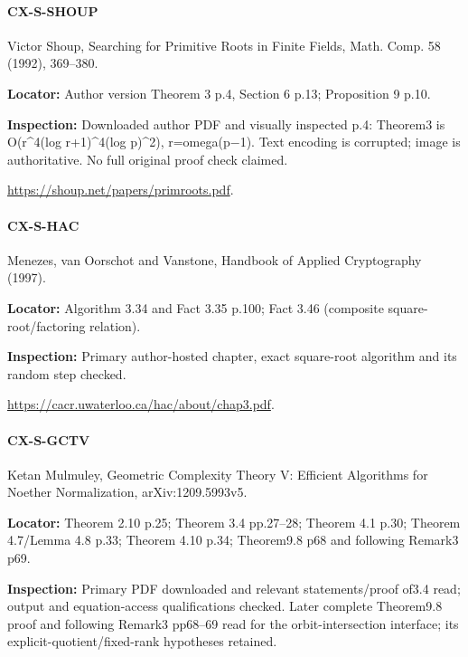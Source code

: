 \documentclass[11pt,a4paper]{article}
\begin{document}
\paragraph{CX-S-SHOUP} Victor Shoup, Searching for Primitive Roots in Finite Fields, Math.\allowbreak{} Comp.\allowbreak{} 58 (1992), 369–\allowbreak{}380.

\textbf{Locator:} Author version Theorem 3 p.\allowbreak{}4, Section 6 p.\allowbreak{}13; Proposition 9 p.\allowbreak{}10.

\textbf{Inspection:} Downloaded author PDF and visually inspected p.\allowbreak{}4:\allowbreak{} Theorem3 is O(r\textasciicircum{}4(log r+1)\textasciicircum{}4(log p)\textasciicircum{}2), r=omega(p\ensuremath{-}1).\allowbreak{} Text encoding is corrupted; image is authoritative.\allowbreak{} No full original proof check claimed.\allowbreak{}

\url{https://shoup.net/papers/primroots.pdf}.

\paragraph{CX-S-HAC} Menezes, van Oorschot and Vanstone, Handbook of Applied Cryptography (1997).

\textbf{Locator:} Algorithm 3.\allowbreak{}34 and Fact 3.\allowbreak{}35 p.\allowbreak{}100; Fact 3.\allowbreak{}46 (composite square-root/\allowbreak{}factoring relation).

\textbf{Inspection:} Primary author-hosted chapter, exact square-root algorithm and its random step checked.\allowbreak{}

\url{https://cacr.uwaterloo.ca/hac/about/chap3.pdf}.

\paragraph{CX-S-GCTV} Ketan Mulmuley, Geometric Complexity Theory V:\allowbreak{} Efficient Algorithms for Noether Normalization, arXiv:\allowbreak{}1209.\allowbreak{}5993v5.

\textbf{Locator:} Theorem 2.\allowbreak{}10 p.\allowbreak{}25; Theorem 3.\allowbreak{}4 pp.\allowbreak{}27–\allowbreak{}28; Theorem 4.\allowbreak{}1 p.\allowbreak{}30; Theorem 4.\allowbreak{}7/\allowbreak{}Lemma 4.\allowbreak{}8 p.\allowbreak{}33; Theorem 4.\allowbreak{}10 p.\allowbreak{}34; Theorem9.\allowbreak{}8 p68 and following Remark3 p69.

\textbf{Inspection:} Primary PDF downloaded and relevant statements/\allowbreak{}proof of3.\allowbreak{}4 read; output and equation-access qualifications checked.\allowbreak{} Later complete Theorem9.\allowbreak{}8 proof and following Remark3 pp68–\allowbreak{}69 read for the orbit-intersection interface; its explicit-quotient/\allowbreak{}fixed-rank hypotheses retained.\allowbreak{}
\end{document}
